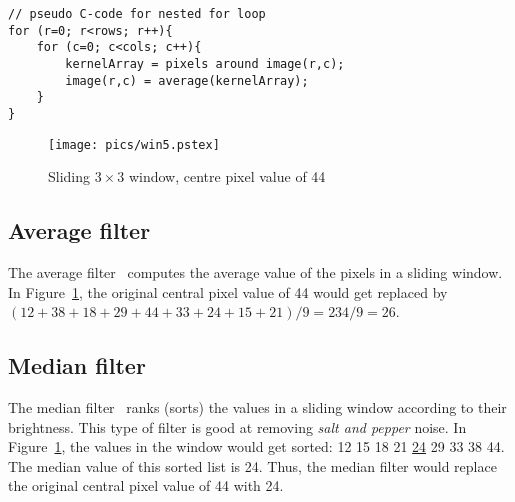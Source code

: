 \documentclass[10pt,twocolumn,letterpaper]{article}
\begin{document}
\scriptsize
\begin{verbatim}
// pseudo C-code for nested for loop
for (r=0; r<rows; r++){
    for (c=0; c<cols; c++){
        kernelArray = pixels around image(r,c);
        image(r,c) = average(kernelArray);
    }
}
\end{verbatim}
\normalsize
\begin{figure}[!htb]
\begin{center}
\setlength{\abovecaptionskip}{-0.25cm}
        \texttt{[image: pics/win5.pstex]}
        \caption{Sliding $3\times3$ window, centre pixel value of 44}
        \label{fig:slidWin}
\setlength{\abovecaptionskip}{0cm}
\end{center}
\end{figure}

\subsection{Average filter}
The average filter~\cite{russbk} computes the average value of the pixels
in a sliding window. In Figure~\ref{fig:slidWin}, the original central pixel value of 44
would get replaced by $(12+38+18+29+44+33+24+15+21) / 9 = 234/9 = 26$.

\subsection{Median filter}
The median filter~\cite{russbk} ranks (sorts) the values in a sliding window
according to their brightness. This type of filter is good at removing 
\emph{salt and pepper} noise. In Figure~\ref{fig:slidWin}, the values in the 
window would get sorted: 12 15 18 21 \underline{24} 29 33 38 44. The median 
value of this sorted list is 24. Thus, the median filter would replace the original central
pixel value of 44 with 24. 
\end{document}
